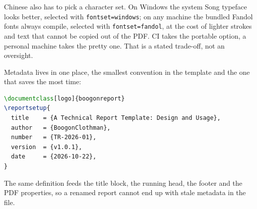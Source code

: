 Chinese also has to pick a character set. On Windows the system Song typeface looks
better, selected with \texttt{fontset=windows}; on any machine the bundled Fandol fonts
always compile, selected with \texttt{fontset=fandol}, at the cost of lighter strokes and
text that cannot be copied out of the PDF. CI takes the portable option, a personal
machine takes the pretty one. That is a stated trade-off, not an oversight.

Metadata lives in one place, the smallest convention in the template and the one that
saves the most time:

\begin{lstlisting}[language=TeX,
  caption={A typical \texttt{\textbackslash reportsetup}. Every key is optional.},
  label={lst:setup}]
\documentclass[logo]{boogonreport}
\reportsetup{
  title    = {A Technical Report Template: Design and Usage},
  author   = {BoogonClothman},
  number   = {TR-2026-01},
  version  = {v1.0.1},
  date     = {2026-10-22},
}
\end{lstlisting}

The same definition feeds the title block, the running head, the footer and the PDF
properties, so a renamed report cannot end up with stale metadata in the file.
